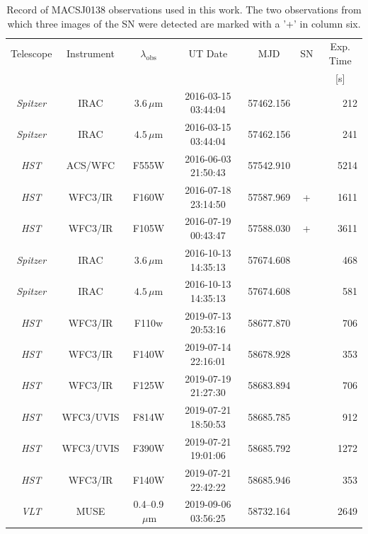 \documentclass[12pt]{article}
\begin{document}
\begin{table}[ht]
\centering
\begin{tabular}{ccccccr}
    \multicolumn{1}{c}{Telescope} & \multicolumn{1}{c}{Instrument} & \multicolumn{1}{c}{$\lambda_\mathrm{obs}$} & \multicolumn{1}{c}{UT Date} & \multicolumn{1}{c}{MJD} & \multicolumn{1}{c}{SN} & \multicolumn{1}{c}{Exp. Time}\\
 & & & & & & \multicolumn{1}{c}{[s]}\\
\midrule
\textit{Spitzer} & IRAC      & $3.6\,\mu\mathrm{m}$      & 2016-03-15 03:44:04 & 57462.156 &   & 212 \\ %
\textit{Spitzer} & IRAC      & $4.5\,\mu\mathrm{m}$      & 2016-03-15 03:44:04 & 57462.156 &   & 241 \\
\textit{HST}     & ACS/WFC   & F555W                     & 2016-06-03 21:50:43 & 57542.910 &   & 5214 \\
\textit{HST}     & WFC3/IR   & F160W                     & 2016-07-18 23:14:50 & 57587.969 & + & 1611 \\
\textit{HST}     & WFC3/IR   & F105W                     & 2016-07-19 00:43:47 & 57588.030 & + & 3611 \\ 
\textit{Spitzer} & IRAC      & $3.6\,\mu\mathrm{m}$      & 2016-10-13 14:35:13 & 57674.608 &   & 468 \\ %
\textit{Spitzer} & IRAC      & $4.5\,\mu\mathrm{m}$      & 2016-10-13 14:35:13 & 57674.608 &   & 581 \\
\midrule
\textit{HST}     & WFC3/IR   & F110w                     & 2019-07-13 20:53:16 & 58677.870 &   & 706 \\ 
\textit{HST}     & WFC3/IR   & F140W                     & 2019-07-14 22:16:01 & 58678.928 &   & 353 \\ 
\textit{HST}     & WFC3/IR   & F125W                     & 2019-07-19 21:27:30 & 58683.894 &   & 706 \\ 
\textit{HST}     & WFC3/UVIS & F814W                     & 2019-07-21 18:50:53 & 58685.785 &   & 912 \\ 
\textit{HST}     & WFC3/UVIS & F390W                     & 2019-07-21 19:01:06 & 58685.792 &   & 1272 \\ 
\textit{HST}     & WFC3/IR   & F140W                     & 2019-07-21 22:42:22 & 58685.946 &   & 353 \\ 
\textit{VLT}     & MUSE      & 0.4--0.9$\,\mu\mathrm{m}$ & 2019-09-06 03:56:25 & 58732.164 &   & 2649  \\
\end{tabular}
\caption{Record of MACSJ0138 observations used in this work.  
The two observations from which three images of the SN were detected are marked with a '+' in column six.
\label{tab:observations}
}
\end{table}
\end{document}
